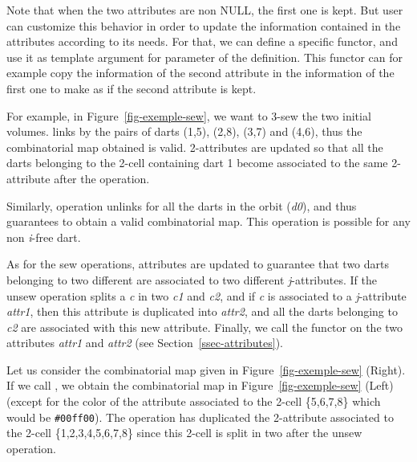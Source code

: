 Note that when the two attributes are non NULL, the first one is
kept. But user can customize this behavior in order to update the
information contained in the attributes according to its needs.  For
that, we can define a specific functor, and use it as template
argument for  parameter of the 
definition. This functor can for example copy the information of the
second attribute in the information of the first one to make as if the
second attribute is kept.

For example, in Figure~\ref{fig-exemple-sew}, we want to 3-sew the two
initial volumes.  links by \betatrois{} the pairs of
darts (1,5), (2,8), (3,7) and (4,6), thus the combinatorial map
obtained is valid. 2-attributes are updated so that all the darts
belonging to the 2-cell containing dart 1 become associated to the
same 2-attribute after the operation.

Similarly,  operation unlinks \betai{} for all the darts
in the orbit 
\orbit{\betaun{},\myldots{},\betaimdeux{},\betaipdeux{},\myldots{},\betad{}}(\emph{d0}), 
and thus guarantees to obtain a valid combinatorial map.  This
operation is possible for any non \emph{i}-free dart.

As for the sew operations, attributes are updated to
guarantee that two darts belonging to two different  are
associated to two different \emph{j}-attributes.  If the unsew operation
splits a  \emph{c} in two  \emph{c1} and \emph{c2}, and if \emph{c} is
associated to a \emph{j}-attribute \emph{attr1}, then this attribute is duplicated
into \emph{attr2}, and all the darts belonging to \emph{c2} are associated
with this new attribute.  Finally, we call the functor 
on the two attributes \emph{attr1} and \emph{attr2} (see
Section~\ref{ssec-attributes}).

Let us consider the combinatorial map given in
Figure~\ref{fig-exemple-sew} (Right). If we call , we
obtain the combinatorial map in Figure~\ref{fig-exemple-sew} (Left)
(except for the color of the attribute associated to the
2-cell \{5,6,7,8\} which would be \texttt{\#00ff00}).  The 
operation has duplicated the 2-attribute associated to the 2-cell
\{1,2,3,4,5,6,7,8\} since this 2-cell is split in two after the
unsew operation.

